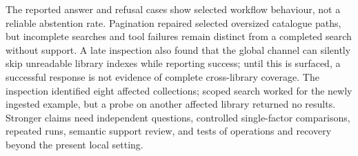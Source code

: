 The reported answer and refusal cases show selected workflow behaviour, not a
reliable abstention rate. Pagination repaired selected oversized catalogue
paths, but incomplete searches and tool failures remain distinct from a
completed search without support. A late inspection also found that the global
channel can silently skip unreadable library indexes while reporting success;
until this is surfaced, a successful response is not evidence of complete
cross-library coverage. The inspection identified eight affected collections;
scoped search worked for the newly ingested example, but a probe on another
affected library returned no results. Stronger claims need
independent questions, controlled single-factor comparisons, repeated runs,
semantic support review, and tests of operations and recovery beyond the
present local setting.
